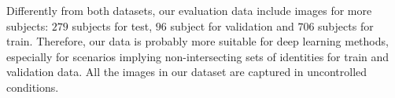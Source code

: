 Differently from both datasets, our evaluation data include images for more subjects: $279$ subjects for test, $96$ subject for validation and $706$ subjects for train. Therefore, our data is probably more suitable for deep learning methods, especially for scenarios implying non-intersecting sets of identities for train and validation data. All the images in our dataset are captured in uncontrolled conditions. 






 



